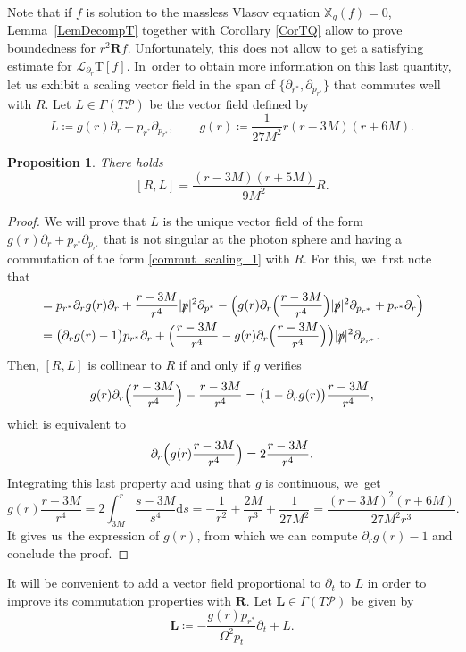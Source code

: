 \documentclass[10pt]{amsart}
\theoremstyle{plain}
\newtheorem{proposition}{Proposition}[section]
\theoremstyle{definition}
\newcommand\T{{\mathbb{X}}}
\begin{document}
Note that if $f$ is solution to the massless Vlasov equation $\T_g(f)=0$, Lemma~\ref{LemDecompT} together with Corollary \ref{CorTQ} allow to prove boundedness for $r^2 \pmb{R}f$. Unfortunately, this does not allow to get a satisfying estimate for $\mathcal{L}_{\partial_r}\mathrm{T}[f]$. In~order to obtain more information on this last quantity, let us exhibit a scaling vector field in the span of $\{\partial_{r^*},\partial_{p_{r^*}}\}$ that commutes well with $R$. Let $L \in \Gamma(T \mathcal{P})$ be the vector field defined by
\[
L \coloneqq g(r) \partial_r + p_{r^*} \partial_{p_{r^*}}, \qquad g(r) \coloneqq \frac{1}{27M^2}r(r-3M)(r+6M).
\]

\begin{proposition}\label{ProL}
There holds
\begin{equation}\label{commut_scaling_1}
[R,L]=\frac{(r-3M)(r+5M)}{9M^2}R.
\end{equation}
\end{proposition}

\begin{proof}
We will prove that $L$ is the unique vector field of the form $g(r) \partial_r + p_{r^*} \partial_{p_{r^*}}$ that is not singular at the photon sphere and having a commutation of the form \eqref{commut_scaling_1} with $R$. For this, we~first note that
\begin{align*}
[R,L] &= p_{r^*} \partial_r g(r) \partial_r+\frac{r-3M}{r^4}|\slashed{p}|^2 \partial_{p^*}-\Bigl(g(r) \partial_r \Bigl(\frac{r-3M}{r^4} \Bigr) |\slashed{p}|^2 \partial_{p_{r^*}}+p_{r^*}\partial_r \Bigr) \\
& = \bigl(\partial_r g(r)-1 \bigr) p_{r^*} \partial_r+ \Bigl(\frac{r-3M}{r^4} -g(r) \partial_r \Bigl(\frac{r-3M}{r^4} \Bigr) \Bigr) |\slashed{p}|^2\partial_{p_{r^*}}.
\end{align*}
Then, $[R,L]$ is collinear to $R$ if and only if $g$ verifies
\[
g(r)\partial_r \Bigl(\frac{r-3M}{r^4} \Bigr)-\frac{r-3M}{r^4}=\bigl(1-\partial_r g(r) \bigr)\frac{r-3M}{r^4},
\]
which is equivalent to
\[
\partial_r \Bigl(g(r) \frac{r-3M}{r^4}\Bigr)=2\frac{r-3M}{r^4}.
\]
Integrating this last property and using that $g$ is continuous, we~get
\[
g(r)\frac{r-3M}{r^4} = 2\int_{3M}^r \frac{s-3M}{s^4} \mathrm{d}s =-\frac{1}{r^2}+\frac{2M}{r^3}+\frac{1}{27M^2} = \frac{(r-3M)^2(r+6M)}{27M^2r^3}.
\]
It gives us the expression of $g(r)$, from which we can compute $\partial_r g(r)-1$ and conclude the proof.
\end{proof}

It will be convenient to add a vector field proportional to $\partial_t$ to $L$ in order to improve its commutation properties with $\pmb{R}$. Let $\pmb{L} \in \Gamma(T \mathcal{P})$ be given by
\begin{equation}\label{eq:defL}
\pmb{L} \coloneqq -\frac{g(r)p_{r^*}}{\Omega^2p_t} \partial_t + L.
\end{equation}
\end{document}

